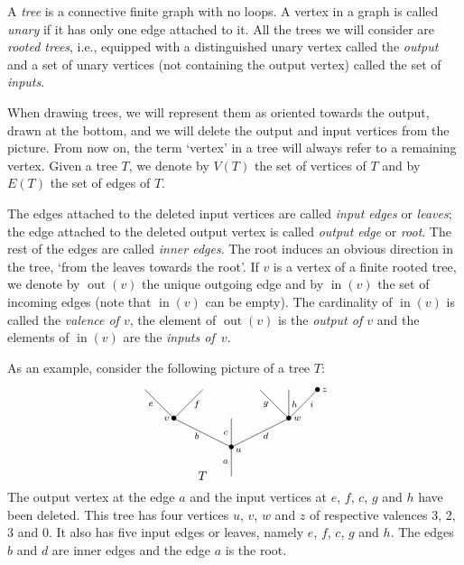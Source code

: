 \documentclass[a4paper]{amsart}
\theoremstyle{plain}
\theoremstyle{definition}
\theoremstyle{remark}
\DeclareMathOperator{\out}{out} \DeclareMathOperator{\inn}{in}
\numberwithin{equation}{section}
\numberwithin{figure}{section}
\begin{document}
A \emph{tree} is a connective finite graph with no loops. A
vertex in a graph is called \emph{unary} if it has only one edge
attached to it. All the trees we will consider are \emph{rooted trees}, i.e., equipped
with a distinguished unary vertex called the \emph{output} and a set of unary vertices (not containing the output vertex)
called the set of \emph{inputs}.

When drawing trees, we will represent them as oriented towards the output, drawn at the bottom, and we will delete the
output and input vertices from the picture. From now on, the term `vertex' in a tree will always refer to a
remaining vertex. Given a tree $T$, we denote by $V(T)$ the set of vertices of $T$ and by $E(T)$ the set of edges of $T$.

The edges attached to the deleted input vertices are called \emph{input edges}
or \emph{leaves}; the edge attached to the deleted output vertex is called \emph{output edge} or \emph{root}. The rest of
the edges are called \emph{inner edges}. The root induces an obvious direction in the tree, `from the leaves towards the
root'. If $v$ is a vertex of a finite rooted tree, we denote by $\out(v)$ the unique
outgoing edge and by $\inn(v)$ the set of incoming edges (note that $\inn(v)$ can be empty).
The cardinality of $\inn(v)$ is called the \emph{valence of $v$}, the element of $\out(v)$ is the
\emph{output of $v$} and the elements of $\inn(v)$ are the \emph{inputs of~$v$}.

As an example, consider the following picture of a tree $T$:

\begin{equation}
\xy<0.08cm, 0cm>: (0,-15)*{}="1"; (0,-5)*=0{\bullet}="2";
(-20,5)*=0{\bullet}="3"; (0,5)*=0{}="4"; (20,5)*=0{\bullet}="5";
(-30,15)*{}="6"; (-10,15)*{}="7"; (10,15)*{}="8"; (20,15)*{}="9";
(30,15)*=0{\bullet}="10"; (-2,-10)*=0{\scriptstyle a};
(2.5,-6)*=0{\scriptstyle u}; (-2,0)*=0{\scriptstyle c};
(-22.5,5)*=0{\scriptstyle v}; (23,5)*=0{\scriptstyle w};
(-28,10)*=0{\scriptstyle e}; (28,10)*=0{\scriptstyle i};
(-12,10)*=0{\scriptstyle f}; (12,-1)*=0{\scriptstyle d};
(-12,-1)*=0{\scriptstyle b}; (12,10)*=0{\scriptstyle g};
(22,10)*=0{\scriptstyle h}; (32.5,15)*=0{\scriptstyle z};
(-10,-15)*{T}; "1";"2" **\dir{-}; "2";"3" **\dir{-}; "2";"4"
**\dir{-}; "2";"5" **\dir{-}; "3";"6" **\dir{-}; "3";"7" **\dir{-};
"5";"8" **\dir{-}; "5";"9" **\dir{-}; "5";"10" **\dir{-};
\endxy
\label{treeexample}
\end{equation}
The output vertex at the edge $a$ and the input vertices at $e$, $f$, $c$, $g$ and $h$ have been deleted.
This tree has four vertices $u$, $v$, $w$ and $z$ of respective valences 3, 2, 3 and 0. It also has five input
edges or leaves, namely $e$, $f$, $c$, $g$ and $h$. The edges $b$ and $d$ are inner edges and the edge $a$ is the root.
\end{document}
